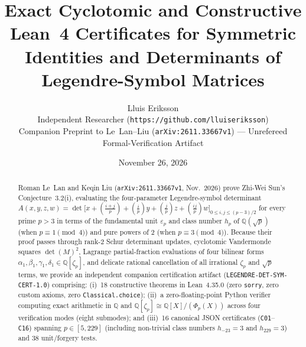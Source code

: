 \documentclass[10pt,twocolumn]{article}
\title{\vspace{-1.2em}\textbf{Exact Cyclotomic and Constructive Lean~4 Certificates for Symmetric Identities and Determinants of Legendre-Symbol Matrices}\vspace{-0.4em}}
\author{Lluis Eriksson\\
\small Independent Researcher (\nolinkurl{https://github.com/lluiseriksson})\\
\small Companion Preprint to Le~Lan--Liu (\texttt{arXiv:2611.33667v1}) --- Unrefereed Formal-Verification Artifact\vspace{-0.6em}}
\date{November 26, 2026}
\begin{document}
\maketitle

\begin{abstract}
\noindent Roman Le~Lan and Keqin Liu (\texttt{arXiv:2611.33667v1}, Nov.~2026) prove Zhi-Wei Sun's Conjecture~3.2(i), evaluating the four-parameter Legendre-symbol determinant $A(x,y,z,w) = \det\!\bigl[x + (\tfrac{i+j}{p}) + (\tfrac{i}{p})y + (\tfrac{j}{p})z + (\tfrac{ij}{p})w\bigr]_{0\le i,j\le (p-3)/2}$ for every prime $p>3$ in terms of the fundamental unit $\varepsilon_p$ and class number $h_p$ of $\mathbb{Q}(\sqrt{p})$ (when $p\equiv 1\pmod 4$) and pure powers of $2$ (when $p\equiv 3\pmod 4$). Because their proof passes through rank-2 Schur determinant updates, cyclotomic Vandermonde squares $\det(M)^2$, Lagrange partial-fraction evaluations of four bilinear forms $\alpha_1,\beta_1,\gamma_1,\delta_1 \in \mathbb{Q}[\zeta_p]$, and delicate rational cancellation of all irrational $\zeta_p$ and $\sqrt{p}$ terms, we provide an independent companion certification artifact (\texttt{LEGENDRE-DET-SYM-CERT-1.0}) comprising: (i)~18 constructive theorems in Lean~4.35.0 (zero \texttt{sorry}, zero custom axioms, zero \texttt{Classical.choice}); (ii)~a zero-floating-point Python verifier computing exact arithmetic in $\mathbb{Q}$ and $\mathbb{Q}[\zeta_p]\cong \mathbb{Q}[X]/(\Phi_p(X))$ across four verification modes (eight submodes); and (iii)~16 canonical JSON certificates (\texttt{C01}--\texttt{C16}) spanning $p\in[5,229]$ (including non-trivial class numbers $h_{-23}=3$ and $h_{229}=3$) and 38 unit/forgery tests.
\end{abstract}
\end{document}
